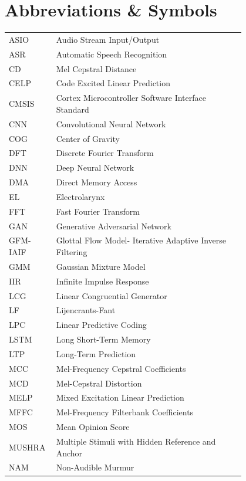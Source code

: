 \chapter*{Abbreviations \& Symbols}

\begin{flushleft}
\begin{tabular}{l p{0.8\linewidth}}
ASIO & Audio Stream Input/Output \\
ASR & Automatic Speech Recognition \\
CD & Mel Cepstral Distance \\
CELP & Code Excited Linear Prediction \\
CMSIS & Cortex Microcontroller Software Interface Standard \\
CNN & Convolutional Neural Network \\
COG & Center of Gravity \\
DFT & Discrete Fourier Transform \\
DNN & Deep Neural Network \\
DMA & Direct Memory Access \\
EL & Electrolarynx \\
FFT & Fast Fourier Transform \\
GAN & Generative Adversarial Network \\
GFM-IAIF & Glottal Flow Model- Iterative Adaptive Inverse Filtering \\
GMM & Gaussian Mixture Model \\
IIR & Infinite Impulse Response \\
LCG & Linear Congruential Generator \\
LF & Lijencrants-Fant \\
LPC & Linear Predictive Coding \\
LSTM & Long Short-Term Memory \\
LTP & Long-Term Prediction \\
MCC & Mel-Frequency Cepstral Coefficients \\
MCD & Mel-Cepstral Distortion \\
MELP & Mixed Excitation Linear Prediction \\
MFFC & Mel-Frequency Filterbank Coefficients \\
MOS & Mean Opinion Score \\
MUSHRA & Multiple Stimuli with Hidden Reference and Anchor \\
NAM & Non-Audible Murmur \\

\end{tabular}
\end{flushleft}
